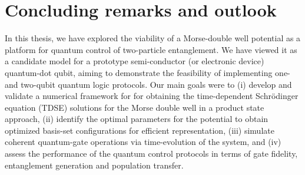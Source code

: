 \documentclass{subfiles}
\begin{document}
\chapter{Concluding remarks and outlook}\label{chap:5}
In this thesis, we have explored the viability of a Morse-double well potential as a platform for quantum control of two-particle entanglement. We have viewed it as a candidate model for a prototype semi-conductor (or electronic device) quantum-dot qubit, aiming to demonstrate the feasibility of implementing one- and two-qubit quantum logic protocols. Our main goals were to (i) develop and validate a numerical framework for for obtaining the time-dependent Schrödinger equation (TDSE) solutions for the Morse double well in a product state approach, (ii) identify the optimal parameters for the potential to obtain optimized basis-set configurations for efficient representation, (iii) simulate coherent quantum-gate operations via time-evolution of the system, and (iv) assess the performance of the quantum control protocols in terms of gate fidelity, entanglement generation and population transfer.
\end{document}
